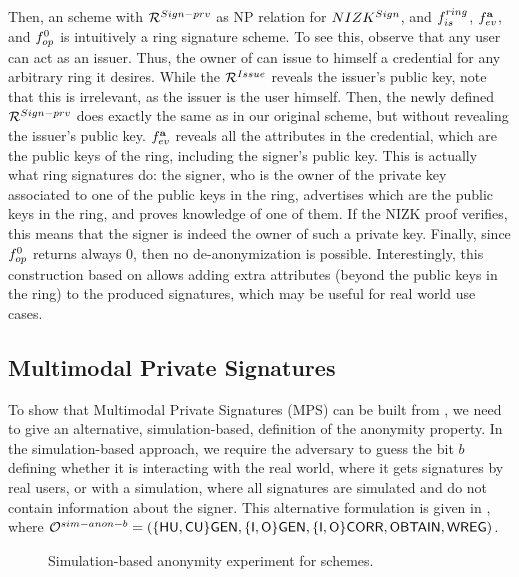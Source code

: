 Then, an \UAS scheme with $\mathcal{R}^{Sign-prv}$ as NP relation for
$NIZK^{Sign}$, and $f_{is}^{ring}$, $f_{ev}^{\mathbf{a}}$, and $f_{op}^0$ is
intuitively a ring signature scheme. To see this, observe that any user can
act as an issuer. Thus, the owner of \usk can issue to himself a credential
for any arbitrary ring it desires. While the $\mathcal{R}^{Issue}$ reveals the
issuer's public key, note that this is irrelevant, as the issuer is the user
himself. Then, the newly defined $\mathcal{R}^{Sign-prv}$ does exactly the same
as in our original \UAS scheme, but without revealing the issuer's public key.
$f_{ev}^{\mathbf{a}}$ reveals all the attributes in the credential, which are
the public keys of the ring, including the signer's public key. This is actually
what ring signatures do: the signer, who is the owner of the private key
associated to one of the public keys in the ring, advertises which are the
public keys in the ring, and proves knowledge of one of them. If the NIZK
proof verifies, this means that the signer is indeed the owner of such a private
key. Finally, since $f_{op}^0$ returns always $0$, then no de-anonymization is
possible.
%
Interestingly, this construction based on \UAS allows adding extra attributes
(beyond the public keys in the ring) to the produced signatures, which may be
useful for real world use cases.

\subsection{Multimodal Private Signatures}

To show that Multimodal Private Signatures (MPS) \needcite can be built from
\UAS, we need to give an alternative, simulation-based, definition of the
anonymity property. In the simulation-based approach, we require the adversary
to guess the bit $b$ defining whether it is interacting with the real world,
where it gets signatures by real users, or with a simulation, where all
signatures are simulated and do not contain information about the signer.
This alternative formulation is given in , where
$\mathcal{O}^{sim-anon-b} = (\lbrace\mathsf{HU},\mathsf{CU}\rbrace\mathsf{GEN},\lbrace\mathsf{I},\mathsf{O}\rbrace\mathsf{GEN},\lbrace\mathsf{I},
\mathsf{O}\rbrace\mathsf{CORR},\mathsf{OBTAIN},\mathsf{WREG})$.

\begin{figure}[htp!]

  \centering
  
  \caption{Simulation-based anonymity experiment for \UAS schemes.}
  \label{fig:exp-uas-simanon}
\end{figure}

